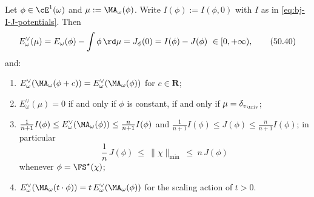 \begin{proposition}
\label{prop:ch50-minimum-norm}
Let $\phi\in\cE^1(\omega)$ and $\mu:=\MA_\omega(\phi)$.  Write
$I(\phi):=I(\phi,0)$ with $I$ as in \eqref{eq:bj-I-J-potentials}.
Then
\[
 E^\vee_\omega(\mu)=E_\omega(\phi)-\int\phi\,\rd\mu
 =J_\phi(0)=I(\phi)-J(\phi)\ \in[0,+\infty),
\tag{50.40}\label{eq:ch50-min-norm-identities}
\]
and:
\begin{enumerate}
\item\label{itm:ch50-mn:transl}
      $E^\vee_\omega(\MA_\omega(\phi+c))=E^\vee_\omega(\MA_\omega(\phi))$
      for $c\in\mathbf R$;
\item\label{itm:ch50-mn:zero}
      $E^\vee_\omega(\mu)=0$ if and only if $\phi$ is constant, if and
      only if $\mu=\delta_{v_{\triv}}$;
\item\label{itm:ch50-mn:comparison}
      $\frac1{n+1}I(\phi)\le E^\vee_\omega(\MA_\omega(\phi))\le
      \frac n{n+1}I(\phi)$ and
      $\frac1{n+1}I(\phi)\le J(\phi)\le\frac n{n+1}I(\phi)$; in
      particular
      \[
       \frac1n\,J(\phi)\ \le\ \|\chi\|_{\min}\ \le\ n\,J(\phi)
      \tag{50.41}\label{eq:ch50-min-vs-J}
      \]
      whenever $\phi=\FS^\star(\chi)$;
\item\label{itm:ch50-mn:scaling}
      $E^\vee_\omega(\MA_\omega(t\cdot\phi))=t\,E^\vee_\omega
      (\MA_\omega(\phi))$ for the scaling action of $t>0$.
\end{enumerate}
\end{proposition}

